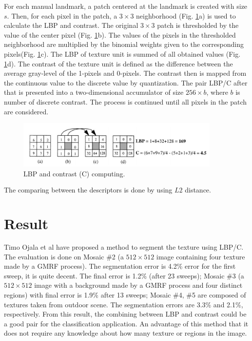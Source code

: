 For each manual landmark, a patch centered at the landmark is created  with size $s$. Then, for each pixel in the patch, a $3 \times 3$ neighborhood (Fig. \ref{figlbpc}a) is used to calculate the LBP and contrast. The original $3 \times 3$ patch is thresholded by the value of the center pixel (Fig. \ref{figlbpc}b). The values of the pixels in the thresholded neighborhood are multiplied by the binomial weights given to the corresponding pixels(Fig. \ref{figlbpc}c). The LBP of texture unit is summed of all obtained values (Fig. \ref{figlbpc}d). The contrast of the texture unit is defined as the difference between the average gray-level of the 1-pixels and 0-pixels. The contrast then is mapped from the continuous value to the discrete value by quantization. The pair LBP/C after that is presented into a two-dimensional accumulator of size $256 \times b$, where $b$ is number of discrete contrast. The process is continued until all pixels in the patch are considered.\\
\begin{figure}[htb]
    \centering
    \includegraphics[width=0.9\textwidth]{./images/lbpc}
    \caption{LBP and contrast (C) computing.}
    \label{figlbpc}
\end{figure}
The comparing between the descriptors is done by using $L2$ distance.
\section{Result}
Timo Ojala et al \cite{ojala1999unsupervised} have proposed a method to segment the texture using LBP/C. The evaluation is done on Mosaic \#2 (a $512 \times 512$ image containing four texture made by a GMRF process). The segmentation error is 4.2\% error for the first sweep, it is quite decent. The final error is 1.2\% (after 23 sweeps); Mosaic \#3 (a $512 \times 512$ image with a background made by a GMRF process and four distinct regions) with final error is 1.9\% after 13 sweeps; Mosaic \#4, \#5 are composed of textures taken from outdoor scene. The segmentation errors are 3.3\% and 2.1\%, respectively. From this result, the combining between LBP and contrast could be a good pair for the classification application. An advantage of this method that it does not require any knowledge about how many texture or regions in the image.


